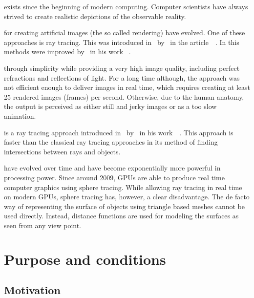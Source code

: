 \documentclass[%
    a4paper,    %
    justified,  %
    nobib,      %
    openany     %
]{tufte-book}
\begin{document}
 exists since the
beginning of modern computing. Computer scientists have always strived to create
realistic depictions of the observable reality.

 for creating artificial images (the so
called rendering) have evolved. One of these approaches is ray tracing. This was
introduced in~\citeyear{appel_techniques_1968}
by~\citeauthor{appel_techniques_1968} in the
article~~\cite{appel_techniques_1968}. In
\citeyear{whitted_improved_1980} this methods were improved
by~\citeauthor{whitted_improved_1980} in his work
~\cite{whitted_improved_1980}.

 through simplicity while providing a very
high image quality, including perfect refractions and reflections of light. For
a long time although, the approach was not efficient enough to deliver images in
real time, which requires creating at least 25 rendered images (frames) per
second. Otherwise, due to the human anatomy, the output is perceived as either
still and jerky images or as a too slow animation.

 is a ray tracing approach introduced
in~\citeyear{hart_sphere_1994} by~\citeauthor{hart_sphere_1994} in his
work~~\cite{hart_sphere_1994}. This approach is
faster than the classical ray tracing approaches in its method of finding
intersections between rays and objects.

 have evolved over time and have
become exponentially more powerful in processing power. Since around 2009, GPUs are able to
produce real time computer graphics using sphere tracing. While allowing ray
tracing in real time on modern GPUs, sphere tracing has, however, a clear
disadvantage. The de facto way of representing the surface of objects using triangle based
meshes cannot be used directly. Instead, distance functions are used for
modeling the surfaces as seen from any view point.

\section{Purpose and conditions}
\label{sec:purpose}

\subsection{Motivation}
\label{subsec:motivation}
\end{document}
